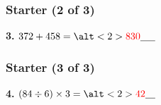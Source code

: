 \documentclass[aspectratio=169]{beamer}
\newcommand{\ablank}[1]{%
  \alt<2>{\textcolor{red}{#1}}{\underline{\phantom{#1}}}%
}
\begin{document}
\begin{frame}
  \frametitle{Starter (2 of 3)}

  \textbf{3.} \quad $372 + 458 = \ablank{830}$

\end{frame}

\begin{frame}
  \frametitle{Starter (3 of 3)}

  \textbf{4.} \quad $(84 \div 6) \times 3 = \ablank{42}$

\end{frame}

\end{document}
